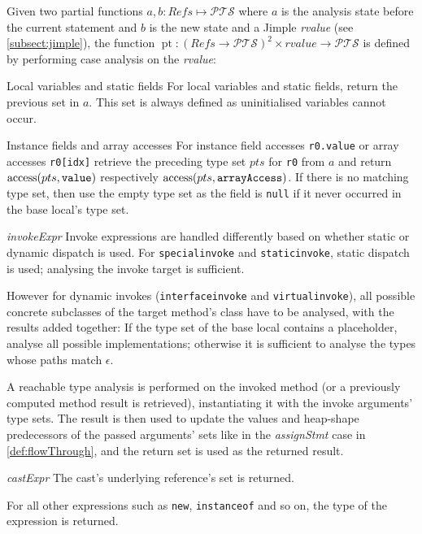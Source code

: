 \begin{definition}\label{def:pt}
Given two partial functions $a, b : \mathit{Refs} \mapsto \mathcal{PTS}$ where $a$ is the analysis state before the current statement and $b$ is the new state and a Jimple \emph{rvalue} (see \cref{subsect:jimple}), the function $\operatorname{pt} : (\mathit{Refs} \to \mathcal{PTS})^2 \times \mathit{rvalue} \to \mathcal{PTS}$ is defined by performing case analysis on the \emph{rvalue}:
\begin{case}
    \item[Local variables and static fields] For local variables and static fields, return the previous set in $a$. This set is always defined as uninitialised variables cannot occur.
    
    \item[Instance fields and array accesses] For instance field accesses \texttt{r0.value} or array accesses \texttt{r0[idx]} retrieve the preceding type set $pts$ for \texttt{r0} from $a$ and return $\operatorname{access}(pts, \texttt{value})$ respectively $\operatorname{access}(pts, \texttt{arrayAccess})$. If there is no matching type set, then use the empty type set as the field is \texttt{null} if it never occurred in the base local's type set.
    
    \item[\emph{invokeExpr}] Invoke expressions are handled differently based on whether static or dynamic dispatch is used.
    For \texttt{specialinvoke} and \texttt{staticinvoke}, static dispatch is used; analysing the invoke target is sufficient.
    
    However for dynamic invokes (\texttt{interfaceinvoke} and \texttt{virtualinvoke}), all possible concrete subclasses of the target method's class have to be analysed, with the results added together: If the type set of the base local contains a placeholder, analyse all possible implementations; otherwise it is sufficient to analyse the types whose paths match $\epsilon$.
    
    A reachable type analysis is performed on the invoked method (or a previously computed method result is retrieved), instantiating it with the invoke arguments' type sets. The result is then used to update the values and heap-shape predecessors of the passed arguments' sets like in the \emph{assignStmt} case in \cref{def:flowThrough}, and the return set is used as the returned result.
    
    \item[\emph{castExpr}] The cast's underlying reference's set is returned.
    
    \item For all other expressions such as \texttt{new}, \texttt{instanceof} and so on, the type of the expression is returned.
\end{case}
\end{definition}

